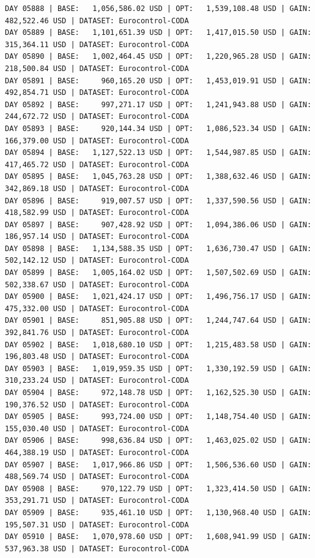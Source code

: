 \documentclass[11pt,a4paper]{article}
\begin{document}
\begin{verbatim}
DAY 05888 | BASE:   1,056,586.02 USD | OPT:   1,539,108.48 USD | GAIN: 482,522.46 USD | DATASET: Eurocontrol-CODA
DAY 05889 | BASE:   1,101,651.39 USD | OPT:   1,417,015.50 USD | GAIN: 315,364.11 USD | DATASET: Eurocontrol-CODA
DAY 05890 | BASE:   1,002,464.45 USD | OPT:   1,220,965.28 USD | GAIN: 218,500.84 USD | DATASET: Eurocontrol-CODA
DAY 05891 | BASE:     960,165.20 USD | OPT:   1,453,019.91 USD | GAIN: 492,854.71 USD | DATASET: Eurocontrol-CODA
DAY 05892 | BASE:     997,271.17 USD | OPT:   1,241,943.88 USD | GAIN: 244,672.72 USD | DATASET: Eurocontrol-CODA
DAY 05893 | BASE:     920,144.34 USD | OPT:   1,086,523.34 USD | GAIN: 166,379.00 USD | DATASET: Eurocontrol-CODA
DAY 05894 | BASE:   1,127,522.13 USD | OPT:   1,544,987.85 USD | GAIN: 417,465.72 USD | DATASET: Eurocontrol-CODA
DAY 05895 | BASE:   1,045,763.28 USD | OPT:   1,388,632.46 USD | GAIN: 342,869.18 USD | DATASET: Eurocontrol-CODA
DAY 05896 | BASE:     919,007.57 USD | OPT:   1,337,590.56 USD | GAIN: 418,582.99 USD | DATASET: Eurocontrol-CODA
DAY 05897 | BASE:     907,428.92 USD | OPT:   1,094,386.06 USD | GAIN: 186,957.14 USD | DATASET: Eurocontrol-CODA
DAY 05898 | BASE:   1,134,588.35 USD | OPT:   1,636,730.47 USD | GAIN: 502,142.12 USD | DATASET: Eurocontrol-CODA
DAY 05899 | BASE:   1,005,164.02 USD | OPT:   1,507,502.69 USD | GAIN: 502,338.67 USD | DATASET: Eurocontrol-CODA
DAY 05900 | BASE:   1,021,424.17 USD | OPT:   1,496,756.17 USD | GAIN: 475,332.00 USD | DATASET: Eurocontrol-CODA
DAY 05901 | BASE:     851,905.88 USD | OPT:   1,244,747.64 USD | GAIN: 392,841.76 USD | DATASET: Eurocontrol-CODA
DAY 05902 | BASE:   1,018,680.10 USD | OPT:   1,215,483.58 USD | GAIN: 196,803.48 USD | DATASET: Eurocontrol-CODA
DAY 05903 | BASE:   1,019,959.35 USD | OPT:   1,330,192.59 USD | GAIN: 310,233.24 USD | DATASET: Eurocontrol-CODA
DAY 05904 | BASE:     972,148.78 USD | OPT:   1,162,525.30 USD | GAIN: 190,376.52 USD | DATASET: Eurocontrol-CODA
DAY 05905 | BASE:     993,724.00 USD | OPT:   1,148,754.40 USD | GAIN: 155,030.40 USD | DATASET: Eurocontrol-CODA
DAY 05906 | BASE:     998,636.84 USD | OPT:   1,463,025.02 USD | GAIN: 464,388.19 USD | DATASET: Eurocontrol-CODA
DAY 05907 | BASE:   1,017,966.86 USD | OPT:   1,506,536.60 USD | GAIN: 488,569.74 USD | DATASET: Eurocontrol-CODA
DAY 05908 | BASE:     970,122.79 USD | OPT:   1,323,414.50 USD | GAIN: 353,291.71 USD | DATASET: Eurocontrol-CODA
DAY 05909 | BASE:     935,461.10 USD | OPT:   1,130,968.40 USD | GAIN: 195,507.31 USD | DATASET: Eurocontrol-CODA
DAY 05910 | BASE:   1,070,978.60 USD | OPT:   1,608,941.99 USD | GAIN: 537,963.38 USD | DATASET: Eurocontrol-CODA

\end{verbatim}
\end{document}
